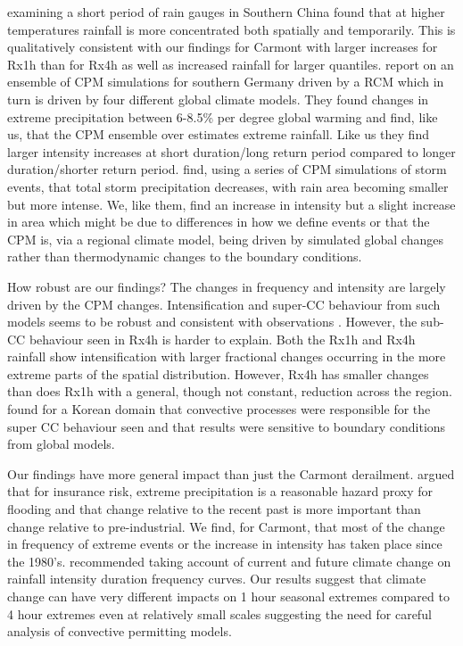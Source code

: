 \documentclass[11pt,a4paper]{article}
\begin{document}
 \cite{long2021rainfall_conc} examining a short period of rain gauges in Southern China found that at higher temperatures rainfall is more concentrated both spatially and temporarily. This is qualitatively consistent with our findings for Carmont with larger increases for Rx1h than for Rx4h as well as increased rainfall for larger quantiles.\cite{hundhausen2024extreme_precip} report on an ensemble of CPM simulations for southern Germany driven by a RCM which in turn is driven by four different global climate models. They found changes in extreme precipitation between 6-8.5\% per degree global warming and find, like us, that the CPM ensemble over estimates extreme rainfall. Like us they find larger intensity increases at short duration/long return period compared to longer duration/shorter return period. \cite{Moshe2022extremes} find, using a series of CPM simulations  of storm events, that total storm precipitation decreases, with rain area becoming smaller but more intense. We, like them, find an increase in intensity but a slight increase in area which might be due to differences in how we define events or that the CPM is, via a regional climate model, being driven by simulated global changes rather than thermodynamic changes to the boundary conditions. 


How robust are our findings? The changes in frequency and intensity are largely driven by the CPM changes. Intensification and super-CC behaviour from such models seems to be robust and consistent with observations \parencite{fowler2021rainfall_extremes}. However, the sub-CC behaviour seen in Rx4h is harder to explain.  Both the Rx1h and Rx4h rainfall show intensification with larger fractional changes occurring in the more extreme parts of the spatial distribution. However, Rx4h has smaller changes than does Rx1h with a general, though not constant, reduction across the region.  \cite{Lee2022CPM_Korea}  found for a Korean domain that convective processes were responsible for the super CC behaviour seen and that results were sensitive to boundary conditions from global models. 

Our findings have more general impact than just the Carmont derailment. \cite{lang2024catmodels} argued that  for insurance risk, extreme precipitation is a reasonable hazard proxy for flooding and  that change relative to the recent past is more important than change relative to pre-industrial. We find, for Carmont, that most of the change in frequency of extreme events or the increase in intensity has taken place since the 1980's.  \cite{martel2021rainfall_ifd} recommended taking account of current and future climate change on rainfall intensity duration frequency curves. Our results suggest that climate change can have very different impacts on 1 hour seasonal extremes compared to 4 hour extremes even at relatively small scales suggesting the need for careful analysis of convective permitting models. 
\end{document}

